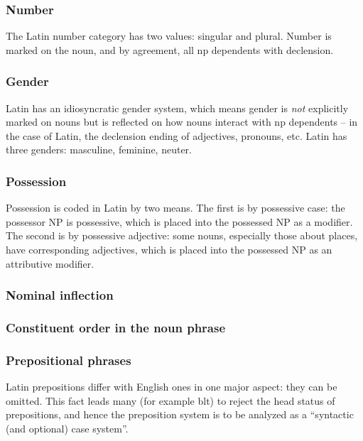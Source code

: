 \documentclass{article}
\begin{document}
\subsubsection{Number}

The Latin number category has two values: singular and plural.
Number is marked on the noun, and by agreement, all \ac{np} dependents with declension.

\subsubsection{Gender}

Latin has an idiosyncratic gender system, 
which means gender is \emph{not} explicitly marked on nouns
but is reflected on how nouns interact with \ac{np} dependents
-- in the case of Latin, the declension ending of adjectives, pronouns, etc. 
Latin has three genders: masculine, feminine, neuter.

\subsubsection{Possession}

Possession is coded in Latin by two means.
The first is by possessive case: 
the possessor NP is possessive, which is placed into the possessed NP as a modifier.
The second is by possessive adjective:
some nouns, especially those about places, have corresponding adjectives,
which is placed into the possessed NP as an attributive modifier.

\subsubsection{Nominal inflection}\label{sec:nominal-inflection-abs}



\subsubsection{Constituent order in the noun phrase}

\subsubsection{Prepositional phrases}\label{sec:prep-abs}

Latin prepositions differ with English ones in one major aspect:
they can be omitted.
This fact leads many (for example \ac{blt}) to reject the head status of prepositions,
and hence the preposition system is to be analyzed as a ``syntactic (and optional) case system''. 
\end{document}
